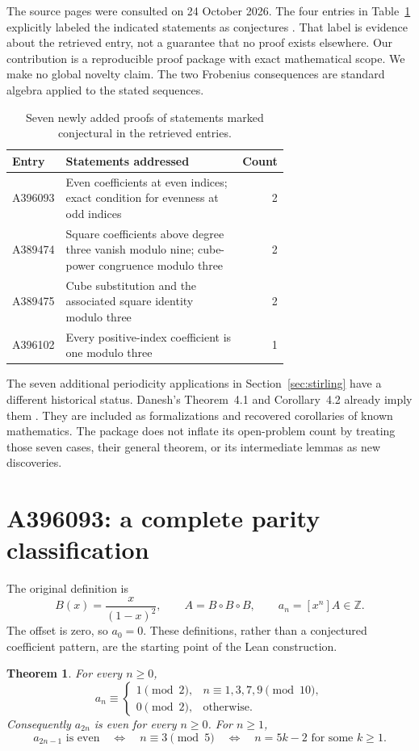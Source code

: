 \documentclass[11pt,a4paper]{article}
\newtheorem{theorem}{Theorem}[section]
\theoremstyle{remark}
\newcommand{\Z}{\mathbb Z}
\begin{document}
The source pages were consulted on 24 October 2026. The four entries in
Table~\ref{tab:new} explicitly labeled the indicated statements as
conjectures \cite{oeis093,oeis474,oeis475,oeis102}. That label is evidence
about the retrieved entry, not a guarantee that no proof exists elsewhere.
Our contribution is a reproducible proof package with exact mathematical
scope. We make no global novelty claim. The two Frobenius consequences
are standard algebra applied to the stated sequences.

\begin{table}[ht]
\centering\small
\begin{tabular}{@{}lp{0.68\linewidth}r@{}}
\toprule
Entry & Statements addressed & Count\\
\midrule
A396093 & Even coefficients at even indices; exact condition for evenness at odd indices & 2\\
A389474 & Square coefficients above degree three vanish modulo nine; cube-power congruence modulo three & 2\\
A389475 & Cube substitution and the associated square identity modulo three & 2\\
A396102 & Every positive-index coefficient is one modulo three & 1\\
\bottomrule
\end{tabular}
\caption{Seven newly added proofs of statements marked conjectural in the retrieved entries.}\label{tab:new}
\end{table}

The seven additional periodicity applications in Section~\ref{sec:stirling}
have a different historical status. Danesh's Theorem~4.1 and
Corollary~4.2 already imply them \cite{danesh}. They are included as
formalizations and recovered corollaries of known mathematics. The package
does not inflate its open-problem count by treating those seven cases,
their general theorem, or its intermediate lemmas as new discoveries.

\section{A396093: a complete parity classification}

The original definition is
\[
B(x)=\frac{x}{(1-x)^2},\qquad A=B\circ B\circ B,
\qquad a_n=[x^n]A\in\Z.
\]
The offset is zero, so $a_0=0$. These definitions, rather than a conjectured
coefficient pattern, are the starting point of the Lean construction.

\begin{theorem}\label{thm:parity}
For every $n\ge0$,
\[
a_n\equiv
\begin{cases}
1\pmod2,&n\equiv1,3,7,9\pmod{10},\\
0\pmod2,&\text{otherwise}.
\end{cases}
\]
Consequently $a_{2n}$ is even for every $n\ge0$. For $n\ge1$,
\[
a_{2n-1}\text{ is even}
\quad\Longleftrightarrow\quad n\equiv3\pmod5
\quad\Longleftrightarrow\quad n=5k-2\text{ for some }k\ge1.
\]
\end{theorem}
\end{document}
